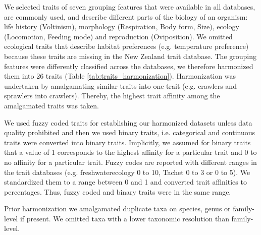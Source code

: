 \documentclass{article}
\begin{document}
We selected traits of seven grouping features that were available in all databases, are commonly used, and describe different parts of the biology of an organism: life history (Voltinism), morphology (Respiration, Body form, Size), ecology (Locomotion, Feeding mode) and reproduction (Oviposition). We omitted ecological traits that describe habitat preferences (e.g. temperature preference) because these traits are missing in the New Zealand trait database. The grouping features were differently classified across the databases, we therefore harmonized them into 26 traits (Table \ref{tab:traits_harmonization}). Harmonization was undertaken by amalgamating similar traits into one trait (e.g. crawlers and sprawlers into crawlers). Thereby, the highest trait affinity among the amalgamated traits was taken. 

We used fuzzy coded traits for establishing our harmonized datasets unless data quality prohibited and then we used binary traits, i.e. categorical and continuous traits were converted into binary traits. Implicitly, we assumed for binary traits that a value of 1 corresponds to the highest affinity for a particular trait and 0 to no affinity for a particular trait. Fuzzy codes are reported with different ranges in the trait databases (e.g. freshwaterecology 0 to 10, Tachet 0 to 3 or 0 to 5). We standardized them to a range between 0 and 1 and converted trait affinities to percentages. Thus, fuzzy coded and binary traits were in the same range. 

Prior harmonization we amalgamated duplicate taxa on species, genus or family-level if present. We omitted taxa with a lower taxonomic resolution than family-level.
\end{document}
